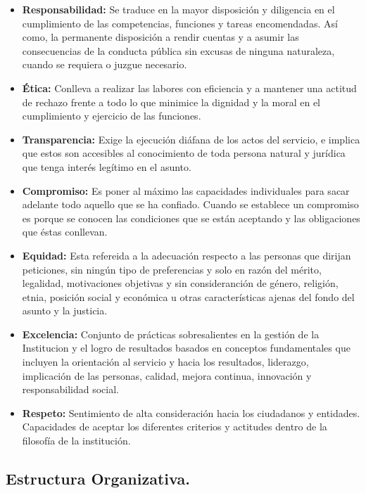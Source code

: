 \documentclass[]{article}
\providecommand{\tightlist}{%
  \setlength{\itemsep}{0pt}\setlength{\parskip}{0pt}}
\begin{document}
\begin{itemize}
\tightlist
\item
  \textbf{Responsabilidad:} Se traduce en la mayor disposición y
  diligencia en el cumplimiento de las competencias, funciones y tareas
  encomendadas. Así como, la permanente disposición a rendir cuentas y a
  asumir las consecuencias de la conducta pública sin excusas de ninguna
  naturaleza, cuando se requiera o juzgue necesario.
\item
  \textbf{Ética:} Conlleva a realizar las labores con eficiencia y a
  mantener una actitud de rechazo frente a todo lo que minimice la
  dignidad y la moral en el cumplimiento y ejercicio de las funciones.
\item
  \textbf{Transparencia:} Exige la ejecución diáfana de los actos del
  servicio, e implica que estos son accesibles al conocimiento de toda
  persona natural y jurídica que tenga interés legítimo en el asunto.
\item
  \textbf{Compromiso:} Es poner al máximo las capacidades individuales
  para sacar adelante todo aquello que se ha confiado. Cuando se
  establece un compromiso es porque se conocen las condiciones que se
  están aceptando y las obligaciones que éstas conllevan.
\item
  \textbf{Equidad:} Esta refereida a la adecuación respecto a las
  personas que dirijan peticiones, sin ningún tipo de preferencias y
  solo en razón del mérito, legalidad, motivaciones objetivas y sin
  consideranción de género, religión, etnia, posición social y económica
  u otras características ajenas del fondo del asunto y la justicia.
\item
  \textbf{Excelencia:} Conjunto de prácticas sobresalientes en la
  gestión de la Institucion y el logro de resultados basados en
  conceptos fundamentales que incluyen la orientación al servicio y
  hacia los resultados, liderazgo, implicación de las personas, calidad,
  mejora continua, innovación y responsabilidad social.
\item
  \textbf{Respeto:} Sentimiento de alta consideración hacia los
  ciudadanos y entidades. Capacidades de aceptar los diferentes
  criterios y actitudes dentro de la filosofía de la institución.
\end{itemize}

\hypertarget{estructura-organizativa.}{%
\subsection{Estructura Organizativa.}\label{estructura-organizativa.}}
\end{document}
